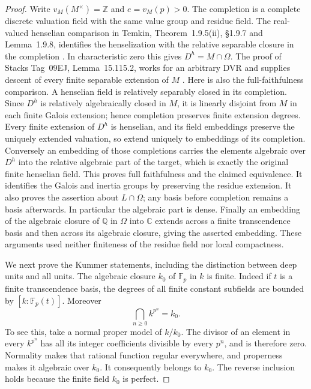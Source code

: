 \begin{proof}
Write $v_M(M^\times)=\mathbb Z$ and $e=v_M(p)>0$.
The completion is a complete discrete valuation
field with the same value group and residue field.
The real-valued henselian comparison in Temkin,
Theorem~1.9.5(ii), \S1.9.7 and Lemma~1.9.8,
identifies the henselization with the relative
separable closure in the completion
\citep{AN_TemkinValuations}.
In characteristic zero this gives $D^h=M\cap\Omega$.
The proof of Stacks Tag~09EJ, Lemma~15.115.2,
works for an arbitrary DVR and supplies descent
of every finite separable extension of $M$
\citep{AN_Stacks09EJ}.
Here is also the full-faithfulness comparison.
A henselian field is relatively separably closed
in its completion.  Since $D^h$ is relatively
algebraically closed in $M$, it is linearly disjoint
from $M$ in each finite Galois extension; hence
completion preserves finite extension degrees.
Every finite extension of $D^h$ is henselian,
and its field embeddings preserve the uniquely
extended valuation, so extend uniquely to embeddings
of its completion.
Conversely an embedding of those completions carries
the elements algebraic over $D^h$ into the relative
algebraic part of the target, which is exactly the
original finite henselian field.
This proves full faithfulness and the claimed
equivalence.  It identifies the Galois and inertia
groups by preserving the residue extension.
It also proves the assertion about $L\cap\Omega$;
any basis before completion remains a basis afterwards.
In particular the algebraic part is dense.
Finally an embedding of the algebraic closure of
$\mathbb Q$ in $\Omega$ into $\mathbb C$ extends
across a finite transcendence basis and then across
its algebraic closure, giving the asserted embedding.
These arguments used neither finiteness of the
residue field nor local compactness.

We next prove the Kummer statements, including the
distinction between deep units and all units.
The algebraic closure $k_0$ of $\mathbb F_p$ in $k$
is finite.  Indeed if $t$ is a finite transcendence
basis, the degrees of all finite constant subfields
are bounded by $[k:\mathbb F_p(t)]$.
Moreover
\[
                       \bigcap_{n\ge0}k^{p^n}=k_0.             \tag{META.DV2}
\]
To see this, take a normal proper model of $k/k_0$.
The divisor of an element in every $k^{p^n}$ has
all its integer coefficients divisible by every
$p^n$, and is therefore zero.
Normality makes that rational function regular
everywhere, and properness makes it algebraic over
$k_0$.  It consequently belongs to $k_0$.
The reverse inclusion holds because the finite
field $k_0$ is perfect.


\end{proof}
